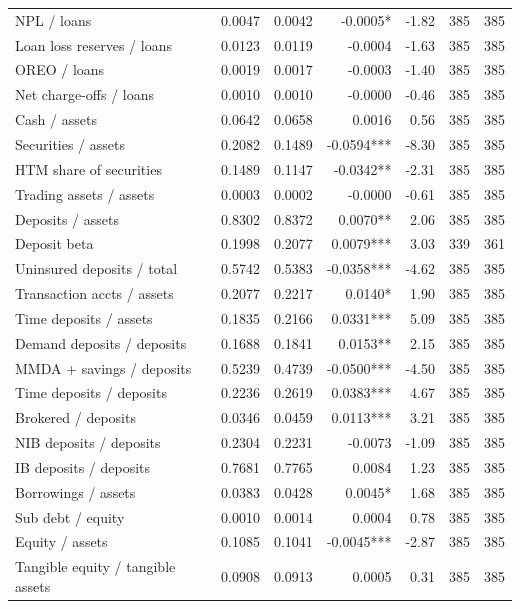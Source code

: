\begin{tabular}{lrrrrrr}
NPL / loans & 0.0047 & 0.0042 & -0.0005* & -1.82 & 385 & 385 \\
Loan loss reserves / loans & 0.0123 & 0.0119 & -0.0004 & -1.63 & 385 & 385 \\
OREO / loans & 0.0019 & 0.0017 & -0.0003 & -1.40 & 385 & 385 \\
Net charge-offs / loans & 0.0010 & 0.0010 & -0.0000 & -0.46 & 385 & 385 \\
Cash / assets & 0.0642 & 0.0658 & 0.0016 & 0.56 & 385 & 385 \\
Securities / assets & 0.2082 & 0.1489 & -0.0594*** & -8.30 & 385 & 385 \\
HTM share of securities & 0.1489 & 0.1147 & -0.0342** & -2.31 & 385 & 385 \\
Trading assets / assets & 0.0003 & 0.0002 & -0.0000 & -0.61 & 385 & 385 \\
Deposits / assets & 0.8302 & 0.8372 & 0.0070** & 2.06 & 385 & 385 \\
Deposit beta & 0.1998 & 0.2077 & 0.0079*** & 3.03 & 339 & 361 \\
Uninsured deposits / total & 0.5742 & 0.5383 & -0.0358*** & -4.62 & 385 & 385 \\
Transaction accts / assets & 0.2077 & 0.2217 & 0.0140* & 1.90 & 385 & 385 \\
Time deposits / assets & 0.1835 & 0.2166 & 0.0331*** & 5.09 & 385 & 385 \\
Demand deposits / deposits & 0.1688 & 0.1841 & 0.0153** & 2.15 & 385 & 385 \\
MMDA + savings / deposits & 0.5239 & 0.4739 & -0.0500*** & -4.50 & 385 & 385 \\
Time deposits / deposits & 0.2236 & 0.2619 & 0.0383*** & 4.67 & 385 & 385 \\
Brokered / deposits & 0.0346 & 0.0459 & 0.0113*** & 3.21 & 385 & 385 \\
NIB deposits / deposits & 0.2304 & 0.2231 & -0.0073 & -1.09 & 385 & 385 \\
IB deposits / deposits & 0.7681 & 0.7765 & 0.0084 & 1.23 & 385 & 385 \\
Borrowings / assets & 0.0383 & 0.0428 & 0.0045* & 1.68 & 385 & 385 \\
Sub debt / equity & 0.0010 & 0.0014 & 0.0004 & 0.78 & 385 & 385 \\
Equity / assets & 0.1085 & 0.1041 & -0.0045*** & -2.87 & 385 & 385 \\
Tangible equity / tangible assets & 0.0908 & 0.0913 & 0.0005 & 0.31 & 385 & 385 \\

\end{tabular}
